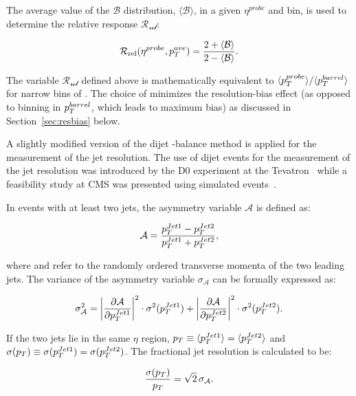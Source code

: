 The average value of the $\mathcal{B}$ distribution, $\langle \mathcal{B}\rangle$, in a given $\eta^{probe}$ and \ptave bin, is used to determine the relative response $\mathcal{R_\text{rel}}$: 

\begin{equation}
\mathcal{R_\text{rel}}(\eta^{probe},p_{{T}}^{{ave}})=\frac{2 + \langle \mathcal{B}\rangle}{2 - \langle \mathcal{B}\rangle}.
\end{equation}

The variable $\mathcal{R_\text{rel}}$ defined above is mathematically equivalent to $\langle p_{{T}}^{probe}\rangle/\langle p_{{T}}^{barrel}\rangle$ for narrow bins of \ptave. The choice of \ptave minimizes the resolution-bias effect (as opposed to binning in $p_{{T}}^{barrel}$, which leads to maximum bias) as discussed in Section~\ref{sec:resbias} below. 

A slightly modified version of the dijet \pt-balance method is applied for the measurement of the jet \pt resolution. The use of dijet events for the measurement of the jet \pt resolution was introduced by the D0 experiment at the Tevatron~\cite{d0-asymmetry} while a feasibility study at CMS was presented using simulated events~\cite{JME-09-007}.

In events with at least two jets, the asymmetry variable $\mathcal{A}$ is defined as:

\begin{equation}
\mathcal{A} = \frac{p_{{T}}^{{Jet}1} - p_{{T}}^{{Jet}2}}{p_{{T}}^{{Jet}1} + p_{{T}}^{{Jet}2}},
\end{equation}

where \ptfirst and \ptsecond refer to the randomly ordered transverse momenta of the two leading jets. The variance of the asymmetry variable $\sigma_\mathcal{A}$ can be formally expressed as:

\begin{equation}
  \sigma_\mathcal{A}^2 = \left|\frac{\partial\mathcal{A}}{\partial p_{{T}}^{{Jet}1}}\right|^2\cdot\sigma^2(p_{{T}}^{{Jet}1}) +
  \left|\frac{\partial\mathcal{A}}{\partial p_{{T}}^{{Jet}2}}\right|^2\cdot\sigma^2(p_{{T}}^{{Jet}2}).
\end{equation}

If the two jets lie in the same $\eta$ region, $p_{{T}}\equiv\langle p_{{T}}^{{Jet}1}\rangle = \langle p_{{T}}^{{Jet}2}\rangle$ and $\sigma(p_{{T}})\equiv\sigma(p_{{T}}^{{Jet}1}) = \sigma(p_{{T}}^{{Jet}2})$. The fractional jet \pt resolution is calculated to be:

\begin{equation}
  \frac{\sigma(p_{{T}})}{p_{{T}}} = \sqrt{2}\,\sigma_\mathcal{A}.
\end{equation}

